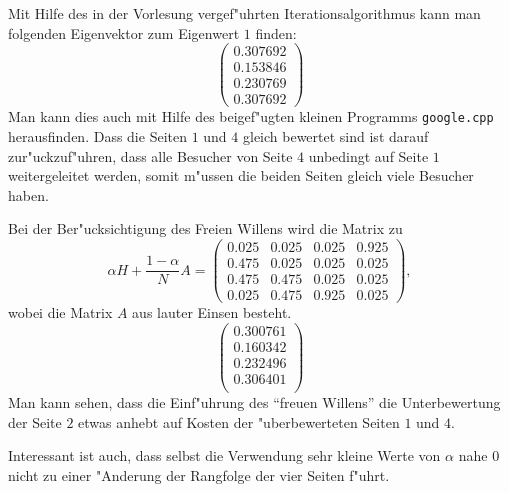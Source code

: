 \begin{loesung}
\begin{teilaufgaben}
Mit Hilfe des in der Vorlesung vergef"uhrten Iterationsalgorithmus
kann man folgenden Eigenvektor zum Eigenwert $1$ finden:
\[
\left(\begin{matrix}
0.307692\\
0.153846\\
0.230769\\
0.307692
\end{matrix}\right)
\]
Man kann dies auch mit Hilfe des beigef"ugten kleinen Programms
{\tt google.cpp} herausfinden.
Dass die Seiten $1$ und $4$ gleich bewertet sind ist darauf zur"uckzuf"uhren,
dass alle Besucher von Seite $4$ unbedingt auf Seite $1$ weitergeleitet
werden, somit m"ussen die beiden Seiten gleich viele Besucher haben.
\item
Bei der Ber"ucksichtigung des Freien Willens wird die Matrix zu
\[
\alpha H+\frac{1-\alpha}N A
=
\left(\begin{matrix}
0.025&0.025&0.025&0.925\\
0.475&0.025&0.025&0.025\\
0.475&0.475&0.025&0.025\\
0.025&0.475&0.925&0.025
\end{matrix}\right),
\]
wobei die Matrix $A$ aus lauter Einsen besteht.
\[
\left(\begin{matrix}
0.300761\\
0.160342\\
0.232496\\
0.306401\\
\end{matrix}\right)
\]
Man kann sehen, dass die Einf"uhrung des ``freuen Willens'' die
Unterbewertung der Seite $2$ etwas anhebt auf Kosten der
"uberbewerteten Seiten $1$ und $4$.

Interessant ist auch, dass selbst die Verwendung sehr kleine Werte von
$\alpha$ nahe $0$ nicht zu einer "Anderung der Rangfolge der vier
Seiten f"uhrt.
\end{teilaufgaben}
\end{loesung}

